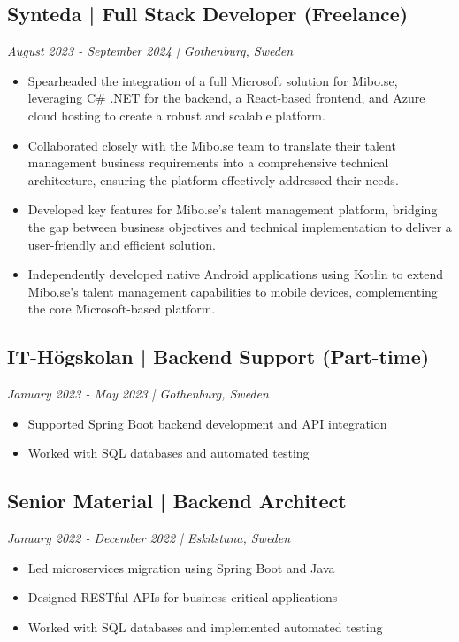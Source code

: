 \documentclass[10pt,a4paper]{article}
\begin{document}
\subsection*{Synteda | Full Stack Developer (Freelance)}
\textit{August 2023 - September 2024 | Gothenburg, Sweden}
\begin{itemize}[noitemsep]
\item Spearheaded the integration of a full Microsoft solution for Mibo.se, leveraging C# .NET for the backend, a React-based frontend, and Azure cloud hosting to create a robust and scalable platform.
\item Collaborated closely with the Mibo.se team to translate their talent management business requirements into a comprehensive technical architecture, ensuring the platform effectively addressed their needs.
\item Developed key features for Mibo.se's talent management platform, bridging the gap between business objectives and technical implementation to deliver a user-friendly and efficient solution.
\item Independently developed native Android applications using Kotlin to extend Mibo.se's talent management capabilities to mobile devices, complementing the core Microsoft-based platform.
\end{itemize}

\subsection*{IT-Högskolan | Backend Support (Part-time)}
\textit{January 2023 - May 2023 | Gothenburg, Sweden}
\begin{itemize}[noitemsep]
\item Supported Spring Boot backend development and API integration
\item Worked with SQL databases and automated testing
\end{itemize}

\subsection*{Senior Material | Backend Architect}
\textit{January 2022 - December 2022 | Eskilstuna, Sweden}
\begin{itemize}[noitemsep]
\item Led microservices migration using Spring Boot and Java
\item Designed RESTful APIs for business-critical applications
\item Worked with SQL databases and implemented automated testing
\end{itemize}
\end{document}
